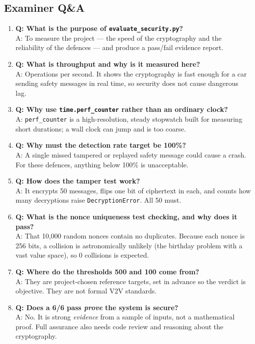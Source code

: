\documentclass[11pt,a4paper]{report}
\begin{document}
\subsection{Examiner Q\&A}
\begin{enumerate}
  \item \textbf{Q: What is the purpose of \texttt{evaluate\_security.py}?}\\
        A: To measure the project --- the speed of the cryptography and the
        reliability of the defences --- and produce a pass/fail evidence report.
  \item \textbf{Q: What is throughput and why is it measured here?}\\
        A: Operations per second. It shows the cryptography is fast enough for a
        car sending safety messages in real time, so security does not cause
        dangerous lag.
  \item \textbf{Q: Why use \texttt{time.perf\_counter} rather than an ordinary clock?}\\
        A: \texttt{perf\_counter} is a high-resolution, steady stopwatch built
        for measuring short durations; a wall clock can jump and is too coarse.
  \item \textbf{Q: Why must the detection rate target be 100\%?}\\
        A: A single missed tampered or replayed safety message could cause a
        crash. For these defences, anything below 100\% is unacceptable.
  \item \textbf{Q: How does the tamper test work?}\\
        A: It encrypts 50 messages, flips one bit of ciphertext in each, and
        counts how many decryptions raise \texttt{DecryptionError}. All 50 must.
  \item \textbf{Q: What is the nonce uniqueness test checking, and why does it
        pass?}\\
        A: That 10{,}000 random nonces contain no duplicates. Because each nonce
        is 256 bits, a collision is astronomically unlikely (the birthday problem
        with a vast value space), so 0 collisions is expected.
  \item \textbf{Q: Where do the thresholds 500 and 100 come from?}\\
        A: They are project-chosen reference targets, set in advance so the
        verdict is objective. They are not formal V2V standards.
  \item \textbf{Q: Does a 6/6 pass \emph{prove} the system is secure?}\\
        A: No. It is strong \emph{evidence} from a sample of inputs, not a
        mathematical proof. Full assurance also needs code review and reasoning
        about the cryptography.
\end{enumerate}
\end{document}
